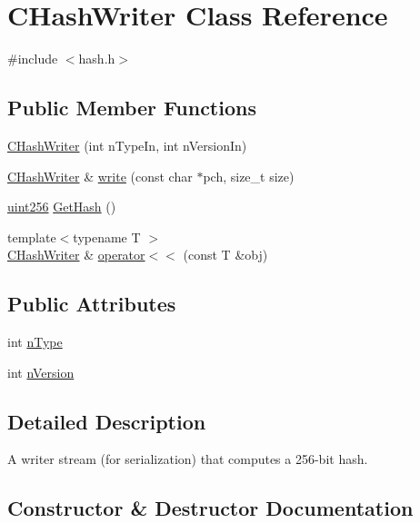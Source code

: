 \hypertarget{class_c_hash_writer}{}\section{C\+Hash\+Writer Class Reference}
\label{class_c_hash_writer}


{\ttfamily \#include $<$hash.\+h$>$}

\subsection*{Public Member Functions}
\begin{DoxyCompactItemize}
\item 
\hyperlink{class_c_hash_writer_a81ce9a497a72fcb6b2612efdc20efbc9}{C\+Hash\+Writer} (int n\+Type\+In, int n\+Version\+In)
\item 
\hyperlink{class_c_hash_writer}{C\+Hash\+Writer} \& \hyperlink{class_c_hash_writer_a779360281eeeb4cc7485c8acae649bc9}{write} (const char $\ast$pch, size\+\_\+t size)
\item 
\hyperlink{classuint256}{uint256} \hyperlink{class_c_hash_writer_ae94a937211502eabf19477630090093a}{Get\+Hash} ()
\item 
{\footnotesize template$<$typename T $>$ }\\\hyperlink{class_c_hash_writer}{C\+Hash\+Writer} \& \hyperlink{class_c_hash_writer_a6551aed7315be5ba750680df18562f3a}{operator$<$$<$} (const T \&obj)
\end{DoxyCompactItemize}
\subsection*{Public Attributes}
\begin{DoxyCompactItemize}
\item 
int \hyperlink{class_c_hash_writer_ae8fe02b05db26a2647a7aeee035f022f}{n\+Type}
\item 
int \hyperlink{class_c_hash_writer_ad7d3642addab58385476dc0f9d55fa58}{n\+Version}
\end{DoxyCompactItemize}


\subsection{Detailed Description}
A writer stream (for serialization) that computes a 256-\/bit hash. 

\subsection{Constructor \& Destructor Documentation}
\hypertarget{class_c_hash_writer_a81ce9a497a72fcb6b2612efdc20efbc9}{}
